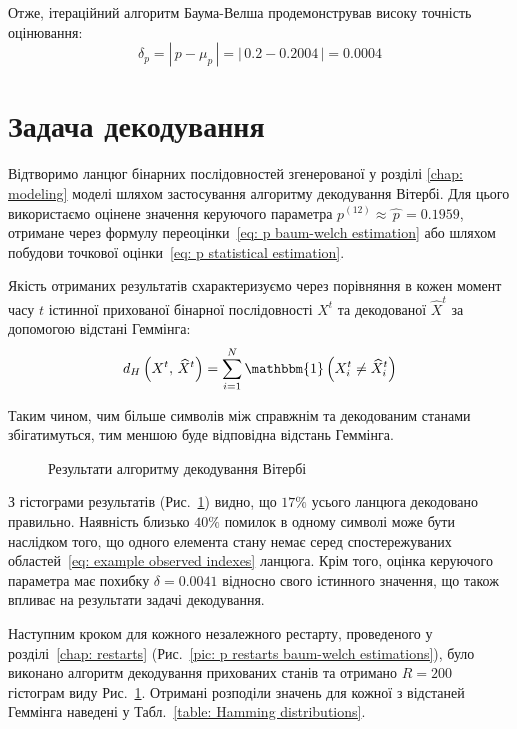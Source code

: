 Отже, ітераційний алгоритм Баума-Велша продемонстрував високу точність оцінювання:
\begin{equation}\label{eq: p accuracy}
    \delta_p = \left|\, p-\mu_p\, \right| = \left|\, 0.2-0.2004\, \right| = 0.0004
\end{equation}

\section{Задача декодування}
\label{chap: decoding}

Відтворимо ланцюг бінарних послідовностей згенерованої у розділі \ref{chap: modeling} моделі шляхом застосування алгоритму декодування Вітербі. Для цього використаємо оцінене значення керуючого параметра $p^{(12)} \approx \widehat{\,p\,}=0.1959$, отримане через формулу переоцінки~\eqref{eq: p baum-welch estimation} або шляхом побудови точкової оцінки~\eqref{eq: p statistical estimation}. 

Якість отриманих результатів схарактеризуємо через порівняння в кожен момент часу $t$ істинної прихованої бінарної послідовності $X^t$ та декодованої $\widehat{X}^t$ за допомогою відстані Геммінга:
\begin{equation*}
    d_H\left( X^t,\,\widehat{X}^t \right) = \sum_{i=1}^{N} \mathbbm{1}\left( X^t_i \neq \widehat{X}^t_i \right)
\end{equation*} 

Таким чином, чим більше символів між справжнім та декодованим станами збігатимуться, тим меншою буде відповідна відстань Геммінга. 

\begin{figure}[H]\centering
    \setfontsize{14pt}
    
    \caption{Результати алгоритму декодування Вітербі}
    \label{pic: viterbi decoding algorithm}
\end{figure}

З гістограми результатів (Рис.~\ref{pic: viterbi decoding algorithm}) видно, що $17\%$ усього ланцюга декодовано правильно. Наявність близько $40\%$ помилок в одному символі може бути наслідком того, що одного елемента стану немає серед спостережуваних областей~\eqref{eq: example observed indexes} ланцюга. Крім того, оцінка керуючого параметра має похибку $\delta=0.0041$ відносно свого істинного значення, що також впливає на результати задачі декодування.

Наступним кроком для кожного незалежного рестарту, проведеного у розділі~\ref{chap: restarts} (Рис.~\ref{pic: p restarts baum-welch estimations}), було виконано алгоритм декодування прихованих станів та отримано $R=200$ гістограм виду Рис.~\ref{pic: viterbi decoding algorithm}. Отримані розподіли значень для кожної з відстаней Геммінга наведені у Табл.~\ref{table: Hamming distributions}.

